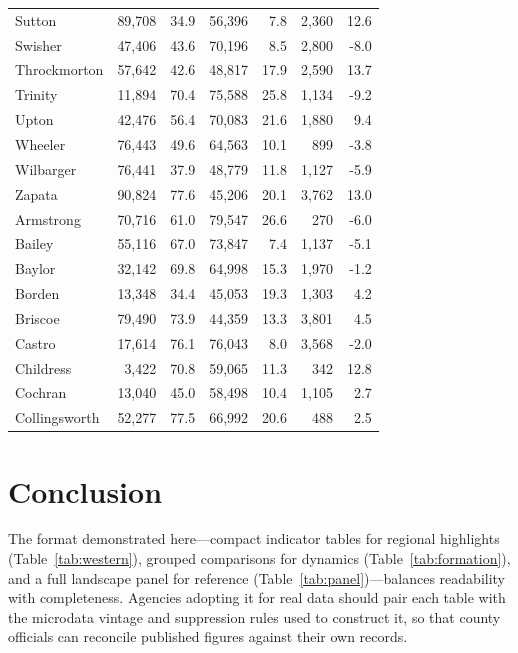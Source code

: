 \documentclass[11pt]{article}
\begin{document}
\begin{landscape}
\begin{longtable}{lrrrrrr}
Sutton & 89,708 & 34.9 & 56,396 & 7.8 & 2,360 & 12.6 \\
Swisher & 47,406 & 43.6 & 70,196 & 8.5 & 2,800 & -8.0 \\
Throckmorton & 57,642 & 42.6 & 48,817 & 17.9 & 2,590 & 13.7 \\
Trinity & 11,894 & 70.4 & 75,588 & 25.8 & 1,134 & -9.2 \\
Upton & 42,476 & 56.4 & 70,083 & 21.6 & 1,880 & 9.4 \\
Wheeler & 76,443 & 49.6 & 64,563 & 10.1 & 899 & -3.8 \\
Wilbarger & 76,441 & 37.9 & 48,779 & 11.8 & 1,127 & -5.9 \\
Zapata & 90,824 & 77.6 & 45,206 & 20.1 & 3,762 & 13.0 \\
Armstrong & 70,716 & 61.0 & 79,547 & 26.6 & 270 & -6.0 \\
Bailey & 55,116 & 67.0 & 73,847 & 7.4 & 1,137 & -5.1 \\
Baylor & 32,142 & 69.8 & 64,998 & 15.3 & 1,970 & -1.2 \\
Borden & 13,348 & 34.4 & 45,053 & 19.3 & 1,303 & 4.2 \\
Briscoe & 79,490 & 73.9 & 44,359 & 13.3 & 3,801 & 4.5 \\
Castro & 17,614 & 76.1 & 76,043 & 8.0 & 3,568 & -2.0 \\
Childress & 3,422 & 70.8 & 59,065 & 11.3 & 342 & 12.8 \\
Cochran & 13,040 & 45.0 & 58,498 & 10.4 & 1,105 & 2.7 \\
Collingsworth & 52,277 & 77.5 & 66,992 & 20.6 & 488 & 2.5 \\
\end{longtable}
\end{landscape}

\section{Conclusion}

The format demonstrated here---compact indicator tables for regional
highlights (Table~\ref{tab:western}), grouped comparisons for dynamics
(Table~\ref{tab:formation}), and a full landscape panel for reference
(Table~\ref{tab:panel})---balances readability with completeness. Agencies
adopting it for real data should pair each table with the microdata vintage
and suppression rules used to construct it, so that county officials can
reconcile published figures against their own records.
\end{document}
